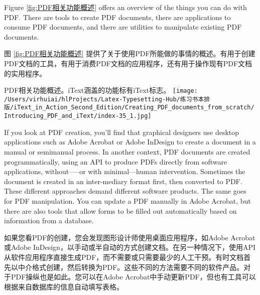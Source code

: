 \documentclass{book}
\begin{document}
Figure \ref{fig:PDF相关功能概述} offers an overview of the things you can do with PDF. There are tools to create PDF documents, there are applications to consume PDF documents, and there are utilities to manipulate existing PDF documents.

图 \ref{fig:PDF相关功能概述} 提供了关于使用PDF所能做的事情的概述。有用于创建PDF文档的工具，有用于消费PDF文档的应用程序，还有用于操作现有PDF文档的实用程序。

\begin{myfigure}{PDF相关功能概述。iText涵盖的功能标有iText标志。\label{fig:PDF相关功能概述}}
\texttt{[image: /Users/virhuiai/hlProjects/Latex-Typesetting-Hub/练习书本排版/iText\_in\_Action\_Second\_Edition/Creating\_PDF\_documents\_from\_scratch/Introducing\_PDF\_and\_iText/index-35\_1.jpg]}
\end{myfigure}


If you look at PDF creation, you’ll find that graphical designers use desktop applications such as Adobe Acrobat or Adobe InDesign to create a document in a manual or semimanual process. In another context, PDF documents are created programmatically, using an API to produce PDFs directly from software applications, without—--or with minimal—human intervention. Sometimes the document is created in an inter-mediary format first, then converted to PDF. These different approaches demand different software products. The same goes for PDF manipulation. You can update a PDF
manually in Adobe Acrobat, but there are also tools that allow forms to be filled out automatically based on information from a database.

如果您看PDF的创建，您会发现图形设计师使用桌面应用程序，如Adobe Acrobat或Adobe InDesign，以手动或半自动的方式创建文档。在另一种情况下，使用API从软件应用程序直接生成PDF，而不需要或只需要最少的人工干预。有时文档首先以中介格式创建，然后转换为PDF。这些不同的方法需要不同的软件产品。对于PDF操纵也是如此。您可以在Adobe Acrobat中手动更新PDF，但也有工具可以根据来自数据库的信息自动填写表格。
\end{document}
